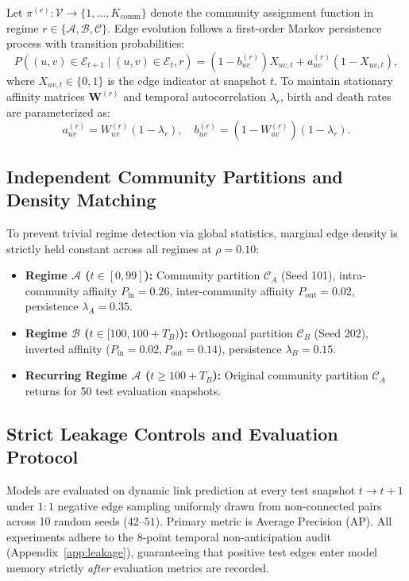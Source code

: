 \documentclass[10pt,twocolumn,letterpaper]{article}
\begin{document}
Let $\pi^{(r)}: \mathcal{V} \to \{1, \dots, K_{\text{comm}}\}$ denote the community assignment function in regime $r \in \{\mathcal{A}, \mathcal{B}, \mathcal{C}\}$. Edge evolution follows a first-order Markov persistence process with transition probabilities:
\begin{equation}
    P((u, v) \in \mathcal{E}_{t+1} \mid (u, v) \in \mathcal{E}_t, r) = (1 - b_{uv}^{(r)}) X_{uv,t} + a_{uv}^{(r)} (1 - X_{uv,t}),
\end{equation}
where $X_{uv,t} \in \{0, 1\}$ is the edge indicator at snapshot $t$. To maintain stationary affinity matrices $\mathbf{W}^{(r)}$ and temporal autocorrelation $\lambda_r$, birth and death rates are parameterized as:
\begin{equation}
    a_{uv}^{(r)} = W_{uv}^{(r)} (1 - \lambda_r), \quad b_{uv}^{(r)} = (1 - W_{uv}^{(r)}) (1 - \lambda_r).
\end{equation}

\subsection{Independent Community Partitions and Density Matching}
To prevent trivial regime detection via global statistics, marginal edge density is strictly held constant across all regimes at $\rho = 0.10$:
\begin{itemize}
    \item \textbf{Regime $\mathcal{A}$ ($t \in [0, 99]$):} Community partition $\mathcal{C}_A$ (Seed 101), intra-community affinity $P_{\text{in}} = 0.26$, inter-community affinity $P_{\text{out}} = 0.02$, persistence $\lambda_A = 0.35$.
    \item \textbf{Regime $\mathcal{B}$ ($t \in [100, 100+T_B)$):} Orthogonal partition $\mathcal{C}_B$ (Seed 202), inverted affinity ($P_{\text{in}} = 0.02, P_{\text{out}} = 0.14$), persistence $\lambda_B = 0.15$.
    \item \textbf{Recurring Regime $\mathcal{A}$ ($t \ge 100+T_B$):} Original community partition $\mathcal{C}_A$ returns for 50 test evaluation snapshots.
\end{itemize}

\subsection{Strict Leakage Controls and Evaluation Protocol}
Models are evaluated on dynamic link prediction at every test snapshot $t \to t+1$ under $1:1$ negative edge sampling uniformly drawn from non-connected pairs across 10 random seeds ($42$--$51$). Primary metric is Average Precision (AP). All experiments adhere to the 8-point temporal non-anticipation audit (Appendix~\ref{app:leakage}), guaranteeing that positive test edges enter model memory strictly \textit{after} evaluation metrics are recorded.
\end{document}
